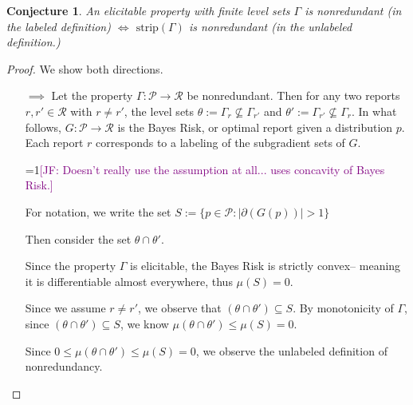 \documentclass[12pt]{article}
\newcommand{\Comments}{1}
\newcommand{\mynote}[2]{\ifnum\Comments=1\textcolor{#1}{#2}\fi}
\newcommand{\jessie}[1]{\mynote{purple}{[JF: #1]}}
\renewcommand{\P}{\mathcal{P}}
\newcommand{\R}{\mathcal{R}}
\newcommand{\inter}[1]{\mathring{#1}}%
\newcommand{\strip}{\text{strip}}
\newtheorem{conjecture}{Conjecture}
\begin{document}
\begin{conjecture}\label{conj:nonredundant-defs-equivalent}
	An elicitable property with finite level sets $\Gamma$ is nonredundant (in the labeled definition) $\iff$ $\strip(\Gamma)$ is nonredundant (in the unlabeled definition.)
\end{conjecture}
\begin{proof}
	We show both directions.\\
	\begin{enumerate}
		\item [$\implies$]
		Let the property $\Gamma:\P \to \R$ be nonredundant.
		Then for any two reports $r, r' \in \R$ with $r \neq r'$, the level sets $\theta := \Gamma_r \not \subseteq \Gamma_{r'}$ and $\theta' := \Gamma_{r'} \not \subseteq \Gamma_r$.
		In what follows, $G : \P \to \R$ is the Bayes Risk, or optimal report given a distribution $p$.
		Each report $r$ corresponds to a labeling of the subgradient sets of $G$.
		
		\jessie{Doesn't really use the assumption at all... uses concavity of Bayes Risk.}
		
		For notation, we write the set $S := \{p \in \P : |\partial(G(p))| > 1\}$
		
		Then consider the set $\theta \cap \theta'$.
		

		
		Since the property $\Gamma$ is elicitable, the Bayes Risk is strictly convex-- meaning it is differentiable almost everywhere, thus $\mu(S) = 0$.
		
		Since we assume $r \neq r'$, we observe that $(\theta\cap\theta') \subseteq S$.
		By monotonicity of $\Gamma$, since $(\theta\cap\theta') \subseteq S$, we know $\mu(\theta \cap \theta') \leq \mu(S) = 0$.
		

		Since $0 \leq \mu(\theta \cap \theta') \leq \mu(S) = 0$, we observe the unlabeled definition of nonredundancy.
		

\end{enumerate}
\end{proof}
\end{document}
